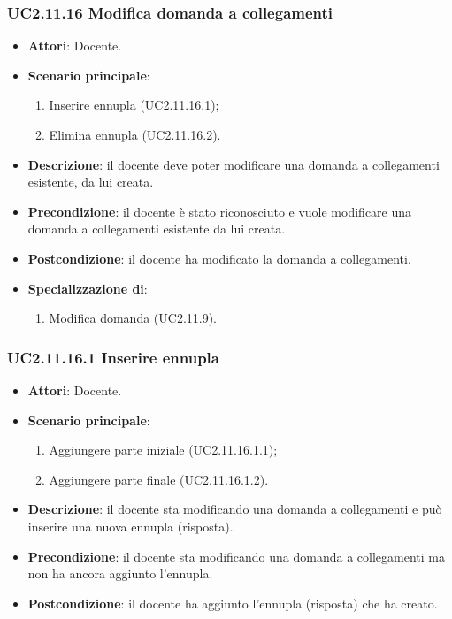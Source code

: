 \subsubsection{UC2.11.16 Modifica domanda a collegamenti}
\begin{itemize}
\item \textbf{Attori}: Docente.
\item \textbf{Scenario principale}:
\begin{enumerate}
\item Inserire ennupla (UC2.11.16.1);
\item Elimina ennupla (UC2.11.16.2).
\end{enumerate}
\item \textbf{Descrizione}: il docente deve poter modificare una domanda a collegamenti esistente, da lui creata.
\item \textbf{Precondizione}: il docente è stato riconosciuto e vuole modificare una domanda a collegamenti esistente da lui creata.
\item \textbf{Postcondizione}: il docente ha modificato la domanda a collegamenti.
\item \textbf{Specializzazione di}:
\begin{enumerate}
\item Modifica domanda (UC2.11.9).
\end{enumerate}
\end{itemize}
\subsubsection{UC2.11.16.1 Inserire ennupla}
\begin{itemize}
\item \textbf{Attori}: Docente.
\item \textbf{Scenario principale}:
\begin{enumerate}
\item Aggiungere parte iniziale (UC2.11.16.1.1);
\item Aggiungere parte finale (UC2.11.16.1.2).
\end{enumerate}
\item \textbf{Descrizione}: il docente sta modificando una domanda a collegamenti e può inserire una nuova ennupla (risposta).
\item \textbf{Precondizione}: il docente sta modificando una domanda a collegamenti ma non ha ancora aggiunto l'ennupla.
\item \textbf{Postcondizione}: il docente ha aggiunto l'ennupla (risposta) che ha creato.
\end{itemize}
